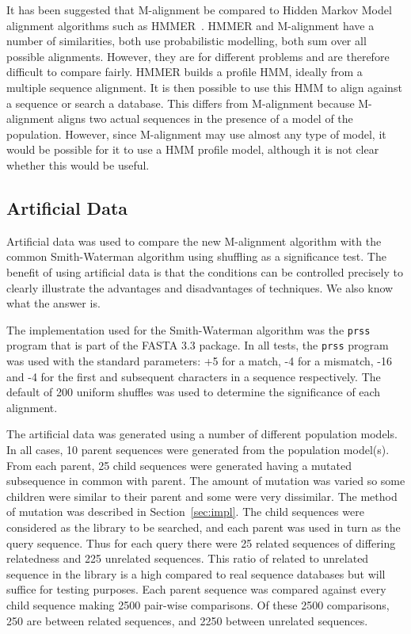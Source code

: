 \documentclass[letterpaper,11pt,oneside]{article}
\begin{document}
\begin{multicols}{2}
It has been suggested that M-alignment be compared to Hidden Markov Model
alignment algorithms such as HMMER~\cite{eddy98}.  HMMER and M-alignment have
a number of similarities, both use probabilistic modelling, both sum over all
possible alignments.  However, they are for different problems and are
therefore difficult to compare fairly.  HMMER builds a profile HMM, ideally
from a multiple sequence alignment.  It is then possible to use this HMM to
align against a sequence or search a database.  This differs from M-alignment
because M-alignment aligns two actual sequences in the presence of a
model of the population.  However, since M-alignment may use almost any type
of model, it would be possible for it to use a HMM profile model, although it
is not clear whether this would be useful.


\subsection{Artificial Data}

Artificial data was used to compare the new M-alignment algorithm with the
common Smith-Waterman algorithm using shuffling as a significance test.  The
benefit of using artificial data is that the conditions can be controlled
precisely to clearly illustrate the advantages and disadvantages of
techniques.
We also know what the answer is.

The implementation used for the Smith-Waterman algorithm was the \verb!prss!
program that is part of the FASTA 3.3 package.  In all tests, the \verb!prss!
program was used with the standard parameters: +5 for a match, -4 for a
mismatch, -16 and -4 for the first and subsequent characters in a sequence
respectively.  The default of 200 uniform shuffles was used to determine the
significance of each alignment.

The artificial data was generated using a number of different population
models.  In all cases, 10 parent sequences were generated from the population
model(s). From
each parent, 25 child sequences were generated having a mutated
subsequence in common with parent.  The amount of mutation was varied so some
children were similar to their parent and some were very dissimilar.  The
method of mutation was described in Section~\ref{sec:impl}.
The child sequences were
considered as the library to be searched, and each parent was used in turn as
the query sequence.  Thus for each query there were 25 related sequences of
differing relatedness and 225 unrelated sequences.  This ratio of related to
unrelated sequence in the library is a high compared to real sequence
databases but will suffice for testing purposes.  Each parent sequence was
compared against every child sequence making 2500 pair-wise comparisons.  Of
these 2500 comparisons, 250 are between related sequences, and 2250 between
unrelated sequences.


\end{multicols}
\end{document}
